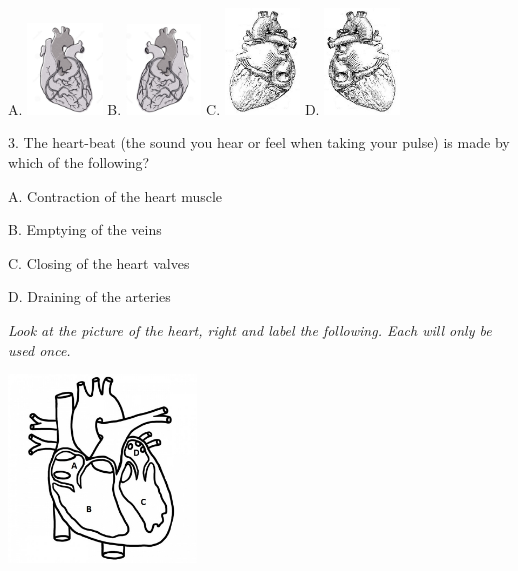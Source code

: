 \documentclass[11.5pt]{sig-alternate} %
\begin{document}
A. \includegraphics[width=2cm]{quiz/heartA.png} B. \includegraphics[width=2cm]{quiz/heartB.jpg} C. \includegraphics[width=2cm]{quiz/heartC.jpg} D. \includegraphics[width=2cm]{quiz/heartD.jpg}

3. The heart-beat (the sound you hear or feel when taking your pulse) is made by which of the following?

A. Contraction of the heart muscle

B. Emptying of the veins

C. Closing of the heart valves

D. Draining of the arteries

\textit{Look at the picture of the heart, right and label the following. Each will only be used once.}

\includegraphics[width=5cm]{quiz/heartmulti.jpg}
\end{document}
